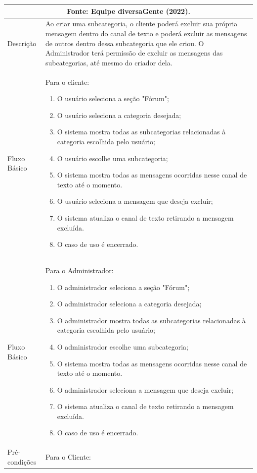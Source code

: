 \documentclass[
    12pt,               %
    openright,          %
    oneside,
    a4paper,            %
    paginasA3,  %
    BIBLATEX,           %
    REFINDENT,          %
    MODELO,             %
    TODO,               %
    english,            %
    brazil              %
    ]{ifsp-spo-inf-ctds} %
\providecommand{\DIFadd}[1]{{\protect\color{blue}\uwave{#1}}} %
\providecommand{\DIFaddend}{} %
\providecommand{\DIFdelbegin}{} %
\providecommand{\DIFdelend}{} %
\begin{document}
\begin{apendicesenv}
\begin{longtable}{|p{3.3cm}|p{12.3cm}|}
		\endfirsthead
		\multicolumn{2}{c}{\scriptsize Fonte: Equipe diversaGente (2022).}%
		{{ \autoref{casos-de-uso5} \DIFadd{continued from previous page}}} \\
		\endhead

		\DIFaddend Descrição & Ao criar uma subcategoria, o cliente poderá excluir sua própria mensagem dentro do canal de texto e poderá excluir as mensagens de outros dentro dessa subcategoria que ele criou. O Administrador terá permissão de excluir as mensagens das subcategorias, até mesmo do criador dela.\\
		\hline
		Fluxo Básico  & 
		Para o cliente:
		\begin{enumerate}
			\item O usuário seleciona a seção "Fórum";
			\item O usuário seleciona a categoria desejada;
			\item O sistema mostra todas as subcategorias relacionadas à categoria escolhida pelo usuário;
			\item O usuário escolhe uma subcategoria;
			\DIFdelbegin %

\DIFdelend \item O sistema mostra todas as mensagens ocorridas nesse canal de texto até o momento. 
			\item O usuário seleciona a mensagem que deseja excluir;
			\item O sistema atualiza o canal de texto retirando a mensagem excluída. 
			\item O  caso de uso é encerrado. 
		\end{enumerate}\\
		\hline
		Fluxo Básico  & 
		Para o Administrador:
		\begin{enumerate}
			\item O administrador seleciona a seção "Fórum";
			\item O administrador seleciona a categoria desejada;
			\item O administrador mostra todas as subcategorias relacionadas à categoria escolhida pelo usuário;
			\item O administrador escolhe uma subcategoria;
			\item O sistema mostra todas as mensagens ocorridas nesse canal de texto até o momento. 
			\item O administrador seleciona a mensagem que deseja excluir;
			\item O sistema atualiza o canal de texto retirando a mensagem excluída. 
			\item O caso de uso é encerrado. 
		\end{enumerate}\\
		\hline
		Pré-condições & Para o Cliente: 


\end{longtable}
\end{apendicesenv}
\end{document}
